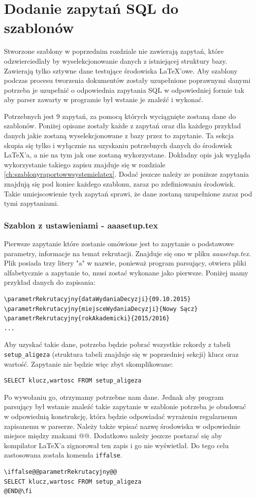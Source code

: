 \section{Dodanie zapytań SQL do szablonów}

Stworzone szablony w poprzednim rozdziale nie zawierają zapytań, które odzwierciedlały by wyselekcjonowanie danych z istniejącej struktury bazy. Zawierają tylko sztywne dane testujące środowiska LaTeX'owe. Aby szablony podczas procesu tworzenia dokumentów zostały uzupełnione poprawnymi danymi potrzeba je uzupełnić o odpowiednia zapytania SQL w odpowiedniej formie tak aby parser zawarty w programie był wstanie je znaleźć i wykonać.
\par 
Potrzebnych jest 9 zapytań, za pomocą których wyciągnięte zostaną dane do szablonów. Poniżej opisane zostały każde z zapytań oraz dla każdego przykład danych jakie zostaną wyselekcjonowane z bazy przez to zapytanie. Ta sekcja skupia się tylko i wyłącznie na uzyskaniu potrzebnych danych do środowisk LaTeX'a, a nie na tym jak one zostaną wykorzystane. Dokładny opis jak wygląda wykorzystanie takiego zapisu znajduje się w rozdziale \ref{ch:szablonyraportowwsystemielatex}. Dodać jeszcze należy ze poniższe zapytania znajdują się pod koniec każdego szablonu, zaraz po zdefiniowaniu środowisk. Takie umiejscowienie tych zapytań sprawi, że dane zostaną uzupełnione zaraz pod tymi zapytaniami.
\par 
\subsubsection*{Szablon z ustawieniami - aaasetup.tex}
Pierwsze zapytanie które zostanie omówione jest to  zapytanie o podstawowe parametry, informacje na temat rekrutacji. Znajduje się ono w pliku \emph{aaasetup.tex}. Plik posiada trzy litery "a" w nazwie, ponieważ program parsujący, otwiera pliki alfabetycznie a zapytanie to, musi zostać wykonane jako pierwsze.  Poniżej mamy przykład danych do zapisania:
 \begin{lstlisting}
\parametrRekrutacyjny{dataWydaniaDecyzji}{09.10.2015}
\parametrRekrutacyjny{miejsceWydaniaDecyzji}{Nowy Sącz}
\parametrRekrutacyjny{rokAkademicki}{2015/2016}
...
\end{lstlisting}
Aby uzyskać takie dane, potrzeba będzie pobrać wszystkie rekordy z tabeli \texttt{setup\_aligeza} (struktura tabeli znajduje się w poprzedniej sekcji) klucz oraz wartość. Zapytanie nie będzie więc zbyt skomplikowane:
 \begin{lstlisting}
SELECT klucz,wartosc FROM setup_aligeza
\end{lstlisting}
Po wywołaniu go, otrzymamy potrzebne nam dane. Jednak aby program parsujący był wstanie znaleźć takie zapytanie w szablonie potrzeba je obudować w odpowiednią konstrukcję, która będzie odpowiadać wyrażeniu regularnemu zapisanemu w parserze. Należy także wpisać nazwę środowiska w odpowiednie miejsce między znakami @@. Dodatkowo należy jeszcze postarać się aby kompilator LaTeX'a zignorował ten zapis i go nie wyświetlał. Do tego celu zastosowana została komenda \texttt{iffalse}.
 \begin{lstlisting}
\iffalse@@parametrRekrutacyjny@@
SELECT klucz,wartosc FROM setup_aligeza
@END@\fi
\end{lstlisting}
